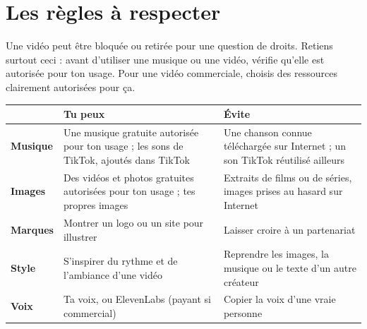 \documentclass[11pt,oneside,openany]{book}
\begin{document}
\chapter*{Les règles à respecter}
Une vidéo peut être bloquée ou retirée pour une question de droits. Retiens surtout ceci : avant d'utiliser une musique ou une vidéo, vérifie qu'elle est autorisée pour ton usage. Pour une vidéo commerciale, choisis des ressources clairement autorisées pour ça.

\renewcommand{\arraystretch}{1.1}
{\small
\begin{xltabular}{\linewidth}{>{\bfseries}p{1.7cm}>{\raggedright\arraybackslash}X>{\raggedright\arraybackslash}X}
\toprule
 & \textcolor{vert}{Tu peux} & \textcolor{rouge}{Évite} \\ \midrule
Musique & Une musique gratuite autorisée pour ton usage ; les sons de TikTok, ajoutés dans TikTok & Une chanson connue téléchargée sur Internet ; un son TikTok réutilisé ailleurs \\
Images & Des vidéos et photos gratuites autorisées pour ton usage ; tes propres images & Extraits de films ou de séries, images prises au hasard sur Internet \\
Marques & Montrer un logo ou un site pour illustrer & Laisser croire à un partenariat \\
Style & S'inspirer du rythme et de l'ambiance d'une vidéo & Reprendre les images, la musique ou le texte d'un autre créateur \\
Voix & Ta voix, ou ElevenLabs (payant si commercial) & Copier la voix d'une vraie personne \\ \bottomrule
\end{xltabular}}

\end{document}
